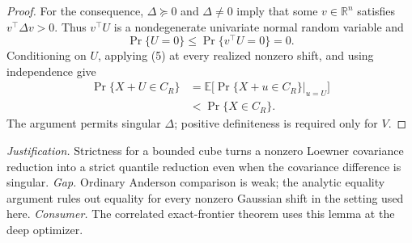 \documentclass{article}
\begin{document}
\begin{proof}
For the consequence, \(\Delta\succeq0\) and \(\Delta\ne0\) imply that some
\(v\in\mathbb R^n\) satisfies \(v^{\top}\Delta v>0\).  Thus
\(v^{\top}U\) is a nondegenerate univariate normal random variable and
\[
 \Pr\{U=0\}\leq\Pr\{v^{\top}U=0\}=0. \tag{6}
\]
Conditioning on \(U\), applying (5) at every realized nonzero shift, and
using independence give
\[
\begin{aligned}
 \Pr\{X+U\in C_R\}
 &=\mathbb E\bigl[\Pr\{X+u\in C_R\}\vert_{u=U}\bigr]\\
 &<\Pr\{X\in C_R\}.
\end{aligned} \tag{7}
\]
The argument permits singular \(\Delta\); positive definiteness is required
only for \(V\).
\end{proof}
\par\smallskip\noindent \textit{Justification.} Strictness for a bounded cube turns a nonzero Loewner covariance reduction into a strict quantile reduction even when the covariance difference is singular. \textit{Gap.} Ordinary Anderson comparison is weak; the analytic equality argument rules out equality for every nonzero Gaussian shift in the setting used here. \textit{Consumer.} The correlated exact-frontier theorem uses this lemma at the deep optimizer.
\end{document}
